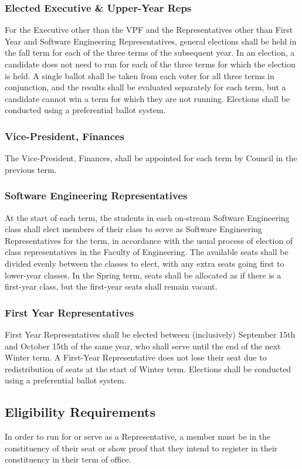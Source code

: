 \subsubsection{Elected Executive \& Upper-Year Reps}
For the Executive other than the VPF and the Representatives other than First
Year and Software Engineering Representatives, general elections shall be held
in the fall term for each of the three terms of the subsequent year. In an
election, a candidate does not need to run for each of the three terms for which
the election is held. A single ballot shall be taken from each voter for all
three terms in conjunction, and the results shall be evaluated separately for
each term, but a candidate cannot win a term for which they are not running.
Elections shall be conducted using a preferential ballot system.

\subsubsection{Vice-President, Finances}
The Vice-President, Finances, shall be appointed for each term by Council in the
previous term.

\subsubsection{Software Engineering Representatives}
At the start of each term, the students in each on-stream Software Engineering
class shall elect members of their class to serve as Software Engineering
Representatives for the term, in accordance with the usual process of election
of class representatives in the Faculty of Engineering. The available seats
shall be divided evenly between the classes to elect, with any extra seats going
first to lower-year classes. In the Spring term, seats shall be allocated as if
there is a first-year class, but the first-year seats shall remain vacant.

\subsubsection{First Year Representatives}
First Year Representatives shall be elected between (inclusively) September 15th and October 15th of the same year, who shall serve until the end of the next Winter term. A First-Year Representative does not lose their seat due to redistribution of seats at the start of Winter term. Elections shall be conducted using a preferential ballot system.

\subsection{Eligibility Requirements}
In order to run for or serve as a Representative, a member must be in the
constituency of their seat or show proof that they intend to register in their
constituency in their term of office.

